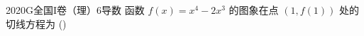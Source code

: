 
\begin{problem}{2020}{G}{全国I卷（理）}{6}{导数}
函数 $ f(x) = x^4 - 2x^3 $ 的图象在点 $ (1, f(1)) $ 处的切线方程为 (\hspace{1cm})
\begin{choices}
\end{choices}
\end{problem}

\begin{answer}

\end{answer}

\begin{solutions}

\end{solutions}